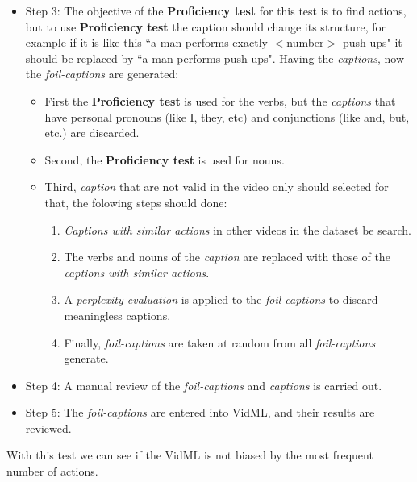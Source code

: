 \begin{itemize}
\begin{itemize}
\begin{itemize}
\end{itemize}
\end{itemize} 
\item Step 3: The objective of the \textbf{Proficiency test} for this test is to find actions, but to use \textbf{Proficiency test} the caption should change its structure, for example if it is like this ``a man performs exactly $<$number$>$ push-ups" it should be replaced by ``a man performs push-ups". Having the \textit{captions}, now the \textit{foil-captions} are generated:
\begin{itemize}
\item First the \textbf{Proficiency test} is used for the verbs, but the \textit{captions} that have personal pronouns (like I, they, etc) and conjunctions (like and, but, etc.) are discarded.
\item Second, the \textbf{Proficiency test} is used for nouns.
\item Third, \textit{caption} that are not valid in the video only should selected for that, the folowing steps should done:
\begin{enumerate}
\item \textit{Captions with similar actions} in other videos in the dataset be search.
\item The verbs and nouns of the \textit{caption} are replaced with those of the \textit{captions with similar actions}.
\item A \textit{perplexity evaluation} is applied to the \textit{foil-captions} to discard meaningless captions.
\item Finally, \textit{foil-captions} are taken at random from all \textit{foil-captions} generate.
\end{enumerate}
\end{itemize}

\item Step 4: A manual review of the \textit{foil-captions} and \textit{captions} is carried out.
\item Step 5: The \textit{foil-captions} are entered into VidML, and their results are reviewed.
\end{itemize}

With this test we can see if the VidML is not biased by the most frequent number of actions.

